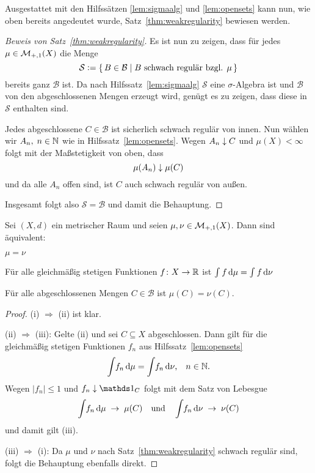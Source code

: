 \documentclass[../main/main.tex]{subfiles}
\begin{document}
	Ausgestattet mit den Hilfssätzen \ref{lem:sigmaalg} und \ref{lem:opensets} kann nun, 
	wie oben bereits angedeutet wurde, Satz~\ref{thm:weakregularity} bewiesen werden.

	\begin{proof}[Beweis von Satz~\ref{thm:weakregularity}]
		Es ist nun zu zeigen, dass für jedes $\mu \in \mathcal{M}_{+,1}(X)$
		die Menge 
		$$\mathcal{S} \vcentcolon = \left\{\, B \in \mathcal{B} \; | \; B \text{ schwach regulär bzgl. } \mu \,\right\}$$
		bereits ganz $\mathcal{B}$ ist. 
		Da nach Hilfssatz~\ref{lem:sigmaalg} $\mathcal{S}$ eine $\sigma$-Algebra ist und 
		$\mathcal{B}$ von den abgeschlossenen Mengen erzeugt wird, genügt es zu zeigen, 
		dass diese in $\mathcal{S}$ enthalten sind. 
		
		Jedes abgeschlossene $C \in \mathcal{B}$ ist sicherlich schwach regulär von innen. 
		Nun wählen wir $A_n, \; n \in \mathbb{N}$ wie in Hilfssatz~\ref{lem:opensets}. 
		Wegen $A_n \downarrow C$ und $\mu(X) < \infty$ folgt mit der Maßstetigkeit von oben, dass
		$$\mu(A_n) \downarrow \mu(C)$$
		und da alle $A_n$ offen sind, ist $C$ auch schwach regulär von außen.
		
		Insgesamt folgt also $\mathcal{S} = \mathcal{B}$ und damit die Behauptung.
	\end{proof}

	\begin{Satz}
		Sei $(X,d)$ ein metrischer Raum und seien $\mu, \nu \in \mathcal{M}_{+,1}(X)$. Dann sind äquivalent:
		\begin{equivalentthm}
			\item $\mu = \nu$
			\item Für alle gleichmäßig stetigen Funktionen $f \colon X \to \mathbb{R}$ ist
					 $\int_{} \, f \, \mathrm{d}\mu = \int_{} \, f \, \mathrm{d}\nu$
			\item Für alle abgeschlossenen Mengen $C \in \mathcal{B}$ ist $\mu(C) = \nu(C)$.
		\end{equivalentthm}
	\end{Satz}

	\begin{proof}
		(i) $\Rightarrow$ (ii) ist klar.
		
		(ii) $\Rightarrow$ (iii): Gelte (ii) und sei $C \subseteq X$ abgeschlossen. 
		Dann gilt für die gleichmäßig stetigen Funktionen $f_n$ aus Hilfssatz~\ref{lem:opensets}
		$$\int_{} \, f_n \, \mathrm{d}\mu = \int_{} \, f_n \, \mathrm{d}\nu\text{,} \quad n \in \mathbb{N} \text{.}$$
		Wegen $| f_n | \leq 1$ und $f_n \convdown \indfct_C$ folgt mit dem Satz von Lebesgue 
		$$\int_{} \, f_n \, \mathrm{d}\mu \; \to \; \mu(C) \quad \text{und} \quad \int_{} \, f_n \, \mathrm{d}\nu 
			\; \to \; \nu(C)$$
		und damit gilt (iii).
		
		(iii) $\Rightarrow$ (i): Da $\mu$ und $\nu$ nach Satz~\ref{thm:weakregularity} 
		schwach regulär sind, folgt die Behauptung ebenfalls direkt.
	\end{proof}
\end{document}
